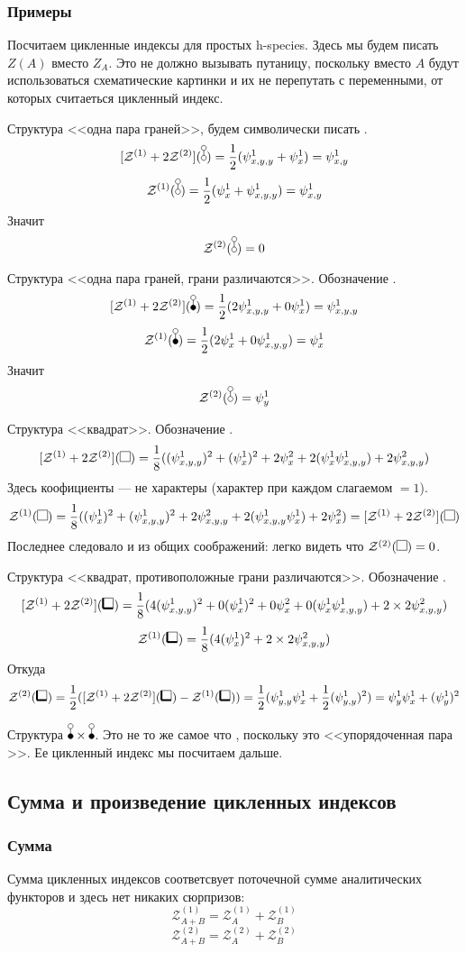\subsubsection{Примеры}
Посчитаем цикленные индексы для простых h-species.
Здесь мы будем писать $Z(A)$ вместо $Z_A$. Это не должно вызывать путаницу,
поскольку вместо $A$ будут использоваться схематические картинки и их
не перепутать с переменными, от которых считаеться цикленный индекс. 

Структура <<одна пара граней>>, будем символически писать \dA.
$$
\Zfull(\dA) = \frac{1}{2}(\psi_{x,y,y}^1 + \psi_{x}^1) = \psi_{x,y}^1
$$
$$
\mathcal Z^{(1)}(\dA) = \frac{1}{2}(\psi_{x}^1 + \psi_{x, y, y}^1) = \psi_{x,y}^1
$$
Значит
$$
\mathcal Z^{(2)}(\dA) = 0
$$

Структура <<одна пара граней, грани различаются>>. Обозначение \dB.
$$
\Zfull(\dB) = \frac{1}{2}(2\psi_{x,y,y}^1 + 0\psi_{x}^1) = \psi_{x,y,y}^1
$$
$$
\mathcal Z^{(1)}(\dB) = \frac{1}{2}(2\psi_{x}^1 + 0\psi_{x, y, y}^1) = \psi_{x}^1
$$
Значит
$$
\mathcal Z^{(2)}(\dA) = \psi_{y}^1
$$

Структура <<квадрат>>. Обозначение \dAA.
$$
\Zfull(\dAA) = \frac{1}{8}((\psi_{x,y,y}^1)^2 + (\psi_{x}^1)^2 + 2\psi_{x}^2 +
2(\psi_x^1\psi_{x,y,y}^1) + 2\psi_{x,y,y}^2)
$$
Здесь коофициенты --- не характеры (характер при каждом слагаемом $= 1$).
$$
\mathcal Z^{(1)}(\dAA) = \frac{1}{8}((\psi_{x}^1)^2 + (\psi_{x, y, y}^1)^2 +
2\psi_{x, y, y}^2 + 2(\psi_{x, y, y}^1\psi_{x}^1) + 2\psi_{x}^2) = \Zfull(\dAA)
$$
Последнее следовало и из общих соображений: легко видеть что $\mathcal
Z^{(2)}(\dAA) = 0$.

Структура <<квадрат, противоположные грани различаются>>. Обозначение \dBB.
$$
\Zfull(\dBB) = \frac{1}{8}(4(\psi_{x,y,y}^1)^2 + 0(\psi_{x}^1)^2 + 0\psi_{x}^2
+ 0(\psi_x^1\psi_{x,y,y}^1) + 2\times2\psi_{x,y,y}^2)
$$
$$
\mathcal Z^{(1)}(\dBB) = \frac{1}{8}(4(\psi_{x}^1)^2 + 2\times2\psi_{x,y,y}^2)
$$
Откуда
$$
\mathcal Z^{(2)}(\dBB) = \frac{1}{2}(\Zfull(\dBB) - \mathcal
Z^{(1)}(\dBB)) = \frac{1}{2}(\psi_{y,y}^1\psi_{x}^1 +
\frac{1}{2}(\psi_{y, y}^1)^2) = \psi_{y}^1\psi_{x}^1 + (\psi_{y}^1)^2 $$

Структура $\dB \times \dB$. Это не то же самое что \dBB, поскольку это <<упорядоченная пара \dB>>.
Ее цикленный индекс мы посчитаем дальше.

\subsection{Сумма и произведение цикленных индексов}
\subsubsection{Сумма}
Сумма цикленных индексов соответсвует поточечной сумме аналитических
функторов и здесь нет никаких сюрпризов:
$$
\mathcal Z_{A + B}^{(1)} = \mathcal Z_A^{(1)} + \mathcal Z_B^{(1)}
$$
$$
\mathcal Z_{A + B}^{(2)} = \mathcal Z_A^{(2)} + \mathcal Z_B^{(2)}
$$
